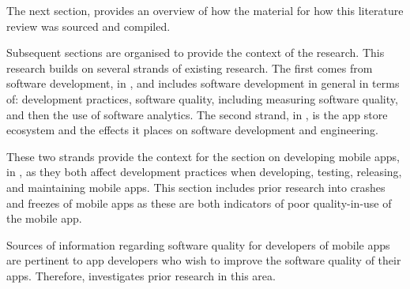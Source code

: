 The next section,  provides an overview of how the material for how this literature review was sourced and compiled.

Subsequent sections are organised to provide the context of the research. This research builds on several strands of existing research. The first comes from software development, in , and includes software development in general in terms of: development practices, software quality, including measuring software quality, and then the use of software analytics. The second strand, in , is the app store ecosystem and the effects it places on software development and engineering.

These two strands provide the context for the section on developing mobile apps, in , as they both affect development practices when developing, testing, releasing, and maintaining mobile apps. This section includes prior research into crashes and freezes of mobile apps as these are both indicators of poor quality-in-use of the mobile app.

Sources of information regarding software quality for developers of mobile apps are pertinent to app developers who wish to improve the software quality of their apps. Therefore,  investigates prior research in this area.


